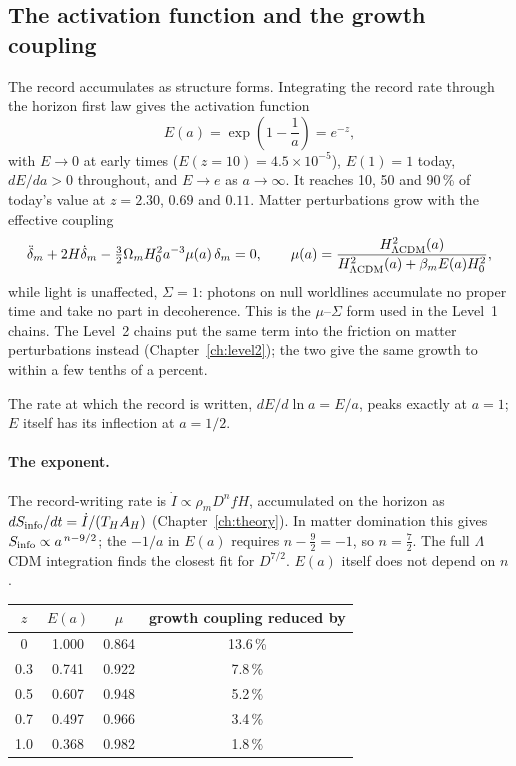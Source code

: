 \subsection{The activation function and the growth coupling}
The record accumulates as structure forms. Integrating the record rate through the horizon first law gives the activation function
\begin{equation}
E(a)=\exp\!\left(1-\frac1a\right)=e^{-z},
\end{equation}
with $E\to0$ at early times ($E(z{=}10)=4.5\times10^{-5}$), $E(1)=1$ today, $dE/da>0$ throughout, and $E\to e$ as $a\to\infty$. It reaches 10, 50 and
90\,\% of today's value at $z=2.30$, $0.69$ and $0.11$. Matter perturbations grow with the effective coupling
\begin{equation}
\ddot\delta_m+2H\dot\delta_m-\tfrac32\Omega_mH_0^2a^{-3}\mu(a)\,\delta_m=0,\qquad
\mu(a)=\frac{H^2_{\Lambda{\rm CDM}}(a)}{H^2_{\Lambda{\rm CDM}}(a)+\beta_mE(a)H_0^2},
\end{equation}
while light is unaffected, $\Sigma=1$: photons on null worldlines accumulate no proper time and take no part in decoherence. This is the
$\mu$--$\Sigma$ form used in the Level~1 chains. The Level~2 chains put the same term into the friction on matter perturbations instead
(Chapter~\ref{ch:level2}); the two give the same growth to within a few tenths of a percent.

The rate at which the record is written, $dE/d\ln a=E/a$, peaks exactly at $a=1$; $E$ itself has its inflection at $a=1/2$.

\paragraph{The exponent.} The record-writing rate is $\dot I\propto\rho_mD^nfH$, accumulated on the horizon as $dS_{\rm info}/dt=\dot I/(T_HA_H)$
(Chapter~\ref{ch:theory}). In matter domination this gives $S_{\rm info}\propto a^{\,n-9/2}$; the $-1/a$ in $E(a)$ requires $n-\tfrac92=-1$, so $n=\tfrac72$.
The full $\Lambda$CDM integration finds the closest fit for $D^{7/2}$. $E(a)$ itself does not depend on $n$.

\begin{center}\small
\begin{tabular}{cccc}
\hline
$z$ & $E(a)$ & $\mu$ & growth coupling reduced by\\\hline
0 & 1.000 & 0.864 & 13.6\,\%\\
0.3 & 0.741 & 0.922 & 7.8\,\%\\
0.5 & 0.607 & 0.948 & 5.2\,\%\\
0.7 & 0.497 & 0.966 & 3.4\,\%\\
1.0 & 0.368 & 0.982 & 1.8\,\%\\\hline
\end{tabular}
\end{center}

